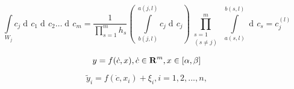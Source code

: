 \documentclass[11pt]{article}
\numberwithin{equation}{subsection}
\DeclareMathOperator{\di}{d\!}
\begin{document}
\begin{equation}
	\int \limits_{W_j} c_{j} \di c_{1} \di c_{2} \ldots  \di c_{m} 
	= \dfrac{1}{\prod\limits_{s=1}^{m}h_{s}}
	\left( \  \int\limits_{b(j,l)}^{a(j,l)} c_{j}  \di c_{j}\right) 
	\prod_{\substack{s=1\\ (s\ne j)}}^m \ 
	\int\limits_{a(s,l)}^{b(s,l)} \!  \di c_{s} 
	= c_{j}^{(l)} 
\label{eq_vector1}
\end{equation}

\begin{equation}
y = f( \dot{c} ,x), \dot{c} \in \textbf{\textbf{R}}^{m}, x \in [\alpha , \beta]
\end{equation}

\begin{equation}
\tilde{y}_{i} = f( \dot{c} ,x_{i}) + \xi_{i}, i = 1,2,...,n ,
\end{equation}
\end{document}
